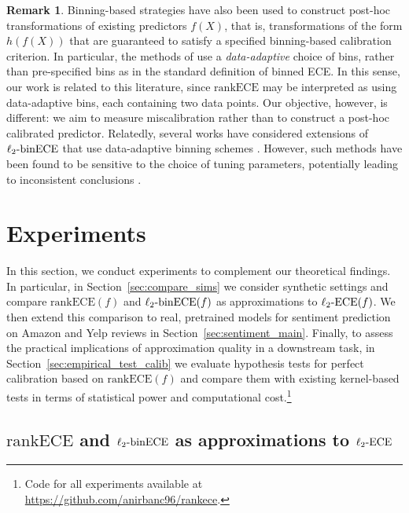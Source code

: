 \documentclass[11pt]{article}
\numberwithin{equation}{section}
\theoremstyle{definition}
\newtheorem{remark}{Remark}[section]
\newcommand{\ECE}{\mathrm{ECE}}
\newcommand{\lECE}{\ell_2\textnormal{-}\ECE}
\newcommand{\binECE}{\mathrm{binECE}}
\newcommand{\lbinECE}{\ell_2\textnormal{-}\binECE}
\newcommand{\rankECE}{\mathrm{rankECE}}
\begin{document}
\begin{remark}

Binning-based strategies have also been used to construct post-hoc transformations of existing predictors $f(X)$, that is, transformations of the form $h(f(X))$ that are guaranteed to satisfy a specified binning-based calibration criterion. In particular, the methods of \citet{gupta2021calibration,zadrozny2001obtaining} use a \emph{data-adaptive} choice of bins, rather than pre-specified bins as in the standard definition of binned ECE. In this sense, our work is related to this literature, since $\rankECE$ may be interpreted as using data-adaptive bins, each containing two data points. Our objective, however, is different: we aim to measure miscalibration rather than to construct a post-hoc calibrated predictor. Relatedly, several works have considered extensions of $\lbinECE$ that use data-adaptive binning schemes \citep{nguyen2015posterior,hendrycks2018deep,nixon2019measuring,futami2024information}. However, such methods have been found to be sensitive to the choice of tuning parameters, potentially leading to inconsistent conclusions \citep{Ashukha2020Pitfalls}.

\end{remark}


\section{Experiments}\label{sec:experiments}
In this section, we conduct experiments to complement our theoretical findings. In particular, in Section~\ref{sec:compare_sims} we consider synthetic settings and compare $\rankECE(f)$ and $\lbinECE(f)$ as approximations to $\lECE(f)$. We then extend this comparison to real, pretrained models for sentiment prediction on Amazon and Yelp reviews in Section~\ref{sec:sentiment_main}. Finally, to assess the practical implications of approximation quality in a downstream task, in Section~\ref{sec:empirical_test_calib} we evaluate hypothesis tests for perfect calibration based on $\rankECE(f)$ and compare them with existing kernel-based tests in terms of statistical power and computational cost.\footnote{Code for all experiments available at \url{https://github.com/anirbanc96/rankece}.}

\subsection{$\rankECE$ and $\lbinECE$ as approximations to $\lECE$}\label{sec:compare_experiments}
\end{document}

